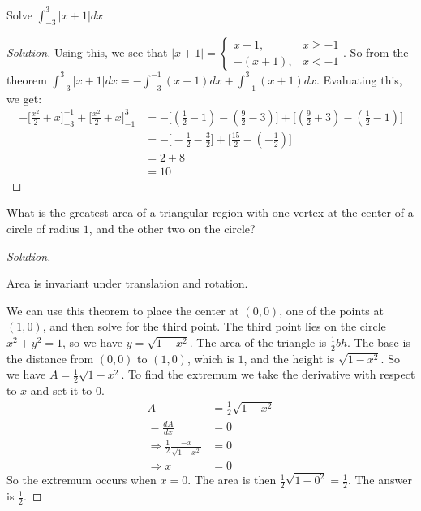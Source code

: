 \documentclass[crop=false,class=article,oneside]{standalone}
\begin{document}
        \begin{problem}
            Solve $\int_{-3}^{3}|x+1|dx$
        \end{problem}
        \begin{proof}[Solution]
            Using this, we see that
            $|x+1|=\begin{cases}%
                x+1,&x\geq -1\\%
                -(x+1),&x< -1%
            \end{cases}$.
            So from the theorem
            $\int_{-3}^{3}|x+1|dx=%
            -\int_{-3}^{-1}(x+1)dx+\int_{-1}^{3}(x+1)dx$.
            Evaluating this, we get:
            \begin{align*}
                -\bigg[\frac{x^2}{2}+x\bigg]_{-3}^{-1}
                +\bigg[\frac{x^2}{2}+x\bigg]_{-1}^{3}
                &=-\bigg[(\frac{1}{2}-1)-(\frac{9}{2}-3)\bigg]
                +\bigg[(\frac{9}{2}+3)-(\frac{1}{2}-1)\bigg]\\
                &=-\bigg[-\frac{1}{2}-\frac{3}{2}\bigg]
                +\bigg[\frac{15}{2}-(-\frac{1}{2})\bigg]\\
                &=2+8\\ 
                &=10
            \end{align*}
        \end{proof}
        \begin{problem}
            What is the greatest area of a triangular
            region with one vertex at the center of
            a circle of radius $1$, and the other
            two on the circle?
        \end{problem}
        \begin{proof}[Solution]
        \begin{theorem*}
            Area is invariant under translation
            and rotation.
        \end{theorem*}
            We can use this theorem to place the center
            at $(0,0)$, one of the points at $(1,0)$,
            and then solve for the third point. The third
            point lies on the circle $x^2+y^2 = 1$, so
            we have $y = \sqrt{1-x^2}$. The area of
            the triangle is $\frac{1}{2}bh$. The base
            is the distance from $(0,0)$ to $(1,0)$,
            which is $1$, and the height is $\sqrt{1-x^2}$.
            So we have $A = \frac{1}{2}\sqrt{1-x^2}$.
            To find the extremum we take the derivative
            with respect to $x$ and set it to $0$.
            \begin{align*}
                A&=\frac{1}{2}\sqrt{1-x^{2}}\\
                =\frac{dA}{dx}&=0\\
                \Rightarrow\frac{1}{2}\frac{-x}{\sqrt{1-x^{2}}}&=0\\
                \Rightarrow x&=0
            \end{align*}
            So the extremum occurs when $x=0$. The area is then $\frac{1}{2}\sqrt{1-0^2} = \frac{1}{2}$. The answer is $\frac{1}{2}$.
            \end{proof}
\end{document}

